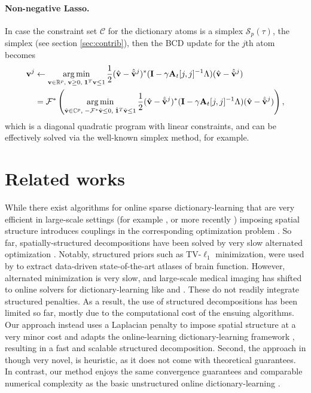 \paragraph{Non-negative Lasso.}
In case the constraint set $\mathcal C$ for the dictionary atoms is a
simplex $\mathcal S_p(\tau)$, the simplex (see section \ref{sec:contrib}), then the BCD update for the $j$th atom becomes
\begin{equation}
  \begin{split}
    \mathbf{v}^j &\leftarrow \operatorname*{arg\,min}_{\mathbf{v} \in \mathbb R^p,\;\mathbf{v} \ge 0,\;\mathbf{1}^T\mathbf{v} \le 1}\frac{1}{2}(\hat{\mathbf{v}} - \hat{\tilde{\mathbf{v}}}^j)^*(\mathbf{I} - \gamma\mathbf{A}_t[j,j]^{-1}\Lambda)(\hat{\mathbf{v}} - \hat{\tilde{\mathbf{v}}}^j)\\
    &= \mathcal F^*\left(\operatorname*{arg\,min}_{\hat{\mathbf{v}} \in \mathbb C^p,\;-\mathcal F^*\hat{\mathbf{v}} \le 0,\; \hat{\mathbf{1}}^T\hat{\mathbf{v}} \le 1}\frac{1}{2}(\hat{\mathbf{v}} - \hat{\tilde{\mathbf{v}}}^j)^*(\mathbf{I} - \gamma\mathbf{A}_t[j,j]^{-1}\Lambda)(\hat{\mathbf{v}} - \hat{\tilde{\mathbf{v}}}^j)\right),
  \end{split}
\end{equation}
which is a diagonal quadratic program with linear constraints, and can be effectively solved via the well-known simplex method, for example.


\section{Related works}
While there exist algorithms for online sparse dictionary-learning
that are very efficient in large-scale settings (for example
  \citep{mairal2010}, or more recently   \citep{mensch2016dictionary})
imposing spatial structure introduces
couplings in the corresponding optimization problem   \citep{dohmatob2014benchmarking}. So far,
spatially-structured decompositions have been solved by very slow
alternated optimization   \citep{varoquaux2011,abraham2013}. Notably,
structured priors such as TV-$\ell_1$   \citep{baldassarre2012} minimization,
were used by   \citep{abraham2013} to extract data-driven
state-of-the-art atlases of brain function.
However, alternated minimization is very slow, and large-scale medical
imaging has shifted to online solvers for
dictionary-learning like   \citep{mairal2010} and   \citep{mensch2016dictionary}.
%
These do not readily
integrate structured penalties. As a result, the use of structured
decompositions has been limited so far, mostly due to the computational
cost of the ensuing algorithms. 
%
Our approach instead uses a Laplacian penalty to impose spatial
structure at a very minor cost and adapts the online-learning
dictionary-learning framework   \citep{mairal2010}, resulting in a fast
and scalable structured decomposition.
%
Second, the approach in   \citep{abraham2013} though very novel, is
heuristic, as it does not come with theoretical guarantees. In contrast, our
method enjoys the same convergence guarantees and comparable numerical
complexity as the basic unstructured online dictionary-learning
  \citep{mairal2010}.

